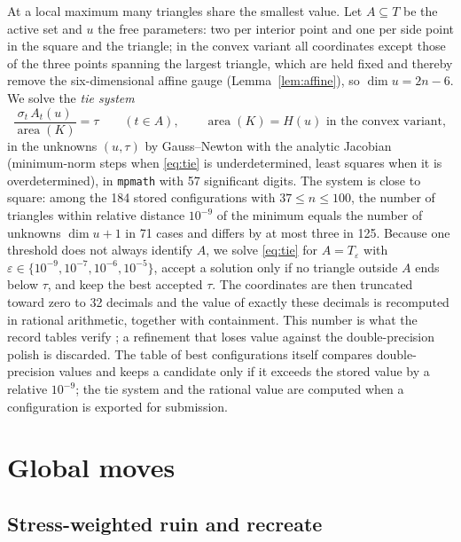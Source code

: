 \documentclass[11pt]{article}
\theoremstyle{remark}
\newcommand{\area}{\operatorname{area}}
\begin{document}
At a local maximum many triangles share the smallest value. Let $A \subseteq T$ be the active set and $u$ the free
parameters: two per interior point and one per side point in the square and the triangle; in the convex variant all
coordinates except those of the three points spanning the largest triangle, which are held fixed and thereby remove
the six-dimensional affine gauge (Lemma~\ref{lem:affine}), so $\dim u = 2n - 6$. We solve the \emph{tie system}
\begin{equation}\label{eq:tie}
  \frac{\sigma_t\, A_t(u)}{\area(K)} = \tau \qquad (t \in A), \qquad \area(K) = H(u) \text{ in the convex variant},
\end{equation}
in the unknowns $(u, \tau)$ by Gauss--Newton with the analytic Jacobian (minimum-norm steps when \eqref{eq:tie} is
underdetermined, least squares when it is overdetermined), in \texttt{mpmath} \cite{mpmath} with 57 significant digits.
The system is close to square: among the 184 stored configurations with $37 \le n \le 100$, the number of triangles
within relative distance $10^{-9}$ of the minimum equals the number of unknowns $\dim u + 1$ in 71 cases and differs
by at most three in 125. Because one threshold does not always identify $A$, we solve \eqref{eq:tie} for $A = T_\varepsilon$ with
$\varepsilon \in \{10^{-9}, 10^{-7}, 10^{-6}, 10^{-5}\}$, accept a solution only if no triangle outside $A$ ends below
$\tau$, and keep the best accepted $\tau$. The coordinates are then truncated toward zero to 32 decimals and the value
of exactly these decimals is recomputed in rational arithmetic, together with containment. This number is what the
record tables verify \cite{HSite}; a refinement that loses value against the double-precision polish is discarded. The
table of best configurations itself compares double-precision values and keeps a candidate only if it exceeds the
stored value by a relative $10^{-9}$; the tie system and the rational value are computed when a configuration is
exported for submission.

\section{Global moves}\label{sec:global}

\subsection{Stress-weighted ruin and recreate}\label{sec:rr}
\end{document}
